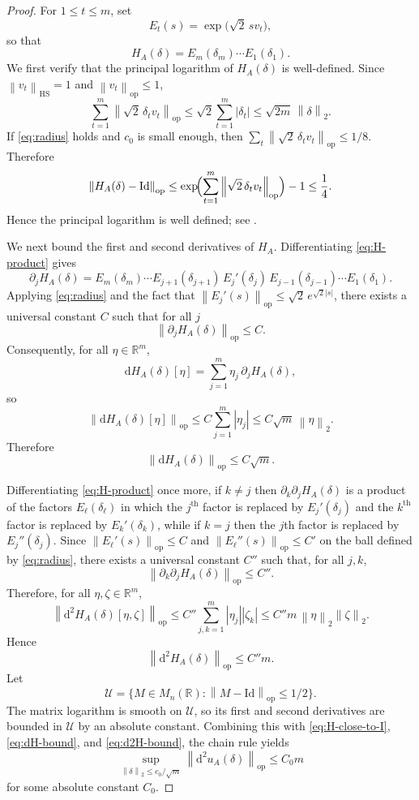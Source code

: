 \documentclass[11pt, reqno]{amsart}
\numberwithin{equation}{section}
\theoremstyle{remark}
\newcommand{\R}{\mathbb{R}}
\newcommand{\1}{\mathbf{1}}
\newcommand{\Id}{\mathrm{Id}}
\newcommand{\HS}{\mathrm{HS}}
\newcommand{\op}{\mathrm{op}}
\newcommand{\dd}{\mathrm{d}}
\newcommand{\norm}[1]{\left\lVert #1\right\rVert}
\newcommand{\abs}[1]{\left\lvert #1\right\rvert}
\begin{document}
\begin{proof}
For $1\le t\le m$, set
\[
E_t(s)=\exp\!\bigl(\sqrt{2}\,s v_t\bigr),
\]
so that
\[
H_A(\delta)=E_m(\delta_m)\cdots E_1(\delta_1).
\]
We first verify that the principal logarithm of $H_A(\delta)$ is well-defined. Since $\norm{v_t}_{\HS}=1$ and $\norm{v_t}_{\op}\le 1$,
\[
\sum_{t=1}^m \norm{\sqrt{2}\,\delta_t v_t}_{\op}
\le
\sqrt{2}\sum_{t=1}^m \abs{\delta_t}
\le
\sqrt{2m}\,\norm{\delta}_2.
\]
If \eqref{eq:radius} holds and $c_0$ is small enough, then
$\sum_t \norm{\sqrt{2}\,\delta_t v_t}_{\op}\le 1/8$.
Therefore
\begin{equation}
\label{eq:H-close-to-I}
\norm{H_A(\delta)-\Id}_{\op}
\le
\exp\!\Bigl(\sum_{t=1}^m \norm{\sqrt{2}\,\delta_t v_t}_{\op}\Bigr)-1
\le \frac14.
\end{equation}
Hence the principal logarithm is well defined; see \cite[Chapter~1]{high:FM}.

We next bound the first and second derivatives of $H_A$.
Differentiating \eqref{eq:H-product} gives
\[
\partial_j H_A(\delta)
=
E_m(\delta_m)\cdots E_{j+1}(\delta_{j+1})
\,E_j'(\delta_j)\,
E_{j-1}(\delta_{j-1})\cdots E_1(\delta_1).
\]
Applying \eqref{eq:radius} and the fact that $\norm{E_j'(s)}_{\op}\le \sqrt{2}\,e^{\sqrt{2}\abs{s}}$, there exists a universal constant $C$ such that for all $j$
\[
\norm{\partial_j H_A(\delta)}_{\op}\le C.
\]
Consequently, for all $\eta\in\R^m$,
\[
\dd H_A(\delta)[\eta]
=
\sum_{j=1}^m \eta_j\,\partial_j H_A(\delta),
\]
so
\[
\norm{\dd H_A(\delta)[\eta]}_{\op}
\le
C\sum_{j=1}^m \abs{\eta_j}
\le C\sqrt{m}\,\norm{\eta}_2.
\]
Therefore
\begin{equation}
\label{eq:dH-bound}
\norm{\dd H_A(\delta)}_{\op}
\le C\sqrt{m}.
\end{equation}

Differentiating \eqref{eq:H-product} once more, if $k\neq j$ then $\partial_k\partial_j H_A(\delta)$ is a product of the factors $E_\ell(\delta_\ell)$ in which the $j^\mathrm{th}$ factor is replaced by $E_j'(\delta_j)$ and the $k^\mathrm{th}$ factor is replaced by $E_k'(\delta_k)$, while if $k=j$ then the $j$th factor is replaced by $E_j''(\delta_j)$. Since $\norm{E_\ell'(s)}_{\op}\le C$ and $\norm{E_\ell''(s)}_{\op}\le C'$ on the ball defined by \eqref{eq:radius}, there exists a universal constant $C''$ such that, for all $j,k$,
\[
\norm{\partial_k\partial_j H_A(\delta)}_{\op}\le C''.
\]
Therefore, for all $\eta,\zeta\in\R^m$,
\[
\norm{\dd^2 H_A(\delta)[\eta,\zeta]}_{\op}
\le
C''\sum_{j,k=1}^m \abs{\eta_j}\abs{\zeta_k}
\le
C''m\,\norm{\eta}_2\norm{\zeta}_2.
\]
Hence
\begin{equation}
\label{eq:d2H-bound}
\norm{\dd^2 H_A(\delta)}_{\op}
\le
C''m.
\end{equation}
Let
\[
\mathcal U=\{M\in M_n(\R): \norm{M-\Id}_{\op}\le 1/2\}.
\]
The matrix logarithm is smooth on $\mathcal U$, so its first and second derivatives are bounded in $\mathcal U$
by an absolute constant.
Combining this with \eqref{eq:H-close-to-I}, \eqref{eq:dH-bound}, and \eqref{eq:d2H-bound},
the chain rule yields
\begin{equation}
\label{eq:d2u-bound}
\sup_{\norm{\delta}_2\le c_0/\sqrt{m}}\norm{\dd^2 u_A(\delta)}_{\op}\le C_0 m
\end{equation}
for some absolute constant $C_0$.


\end{proof}
\end{document}
